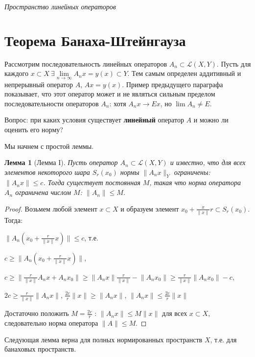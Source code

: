 \documentclass[12pt,a4paper,titlepage, oneside]{book}
\theoremstyle{definition}
\theoremstyle{plain}
\theoremstyle{remark}
\theoremstyle{remark}
\theoremstyle{remark}
\theoremstyle{plain}
\newtheorem*{lemma}{Лемма}
\theoremstyle{plain}
\begin{document}
\emph{Пространство линейных операторов}

\section{Теорема Банаха-Штейнгауза}
Рассмотрим последовательность линейных операторов $A_n \subset \mathcal{L}(X,Y)$. Пусть для каждого $x \subset X\ \exists \lim\limits_{n\to \infty}A_n x = y(x) \subset Y$. Тем самым определен аддитивный и непрерывный оператор $A$, $Ax = y(x)$. Пример предыдущего параграфа показывает, что этот оператор может и не являться сильным пределом последовательности операторов $A_n$: хотя $A_n x \to E x$, но $\lim A_n \ne E$.

Вопрос: при каких условия существует \textbf{линейный} оператор $A$ и можно ли оценить его норму?

Мы начнем с простой леммы.

\begin{lemma}[Лемма I]
Пусть оператор $A_n \subset \mathcal{L}(X,Y)$ и известно, что для всех элементов некоторого шара $S_r(x_0)$ нормы $\lVert A_n x\rVert_Y$ ограничены: $\lVert A_n x\rVert \le c$. Тогда существует постоянная $M$, такая что норма оператора $A_n$ ограничена числом $M$: $\lVert A_n \rVert \le M$.
\end{lemma}

\begin{proof}
Возьмем любой элемент $x \subset X$ и образуем элемент $x_0+\frac{x}{\lVert x\rVert}r \subset S_r(x_0)$. Тогда:

\begin{center}
$\lVert A_n(x_0+\frac{r}{\lVert x\rVert}x)\rVert \le c$, т.е.

$c \ge \lVert A_n(x_0+\frac{r}{\lVert x\rVert}x)\rVert$,

$c \ge \lVert \frac{r}{\lVert x\rVert}A_n x + A_n x_0 \rVert \ge \lVert A_n x\rVert \frac{r}{\lVert x\rVert} - \lVert A_n x_0\rVert \ge \frac{r}{\lVert x\rVert}\lVert A_n x_0\rVert - c$,

$2c \ge \frac{r}{\lVert x\rVert}\lVert A_n x\rVert$, $\frac{2c}{r}\lVert x\rVert \ge \lVert A_n x\rVert$, $\lVert A_n x\rVert \le \frac{2c}{r}\lVert x\rVert$
\end{center}

Достаточно положить $M=\frac{2c}{r}$ : $\lVert A_n x\rVert \le M\lVert x\rVert$ для всех $x \subset X$, следовательно норма оператора $\lVert A\rVert \le M$.
\end{proof}

Следующая лемма верна для полных нормированных пространств $X$, т.е. для банаховых пространств.
\end{document}
